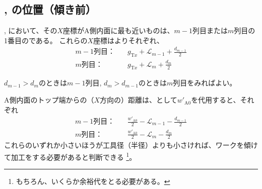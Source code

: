 \clearpage
\subsection{\BfaceDimple, \DfaceDimple の位置（傾き前）}
\BfaceDimple, \DfaceDimple において、その$X$座標がA側内面に最も近いものは、$m-1$列目または$m$列目の1番目の\nameDimple である。
これらの$X$座標はよりそれぞれ、
\begin{align*}
  m-1\text{列目：}&\quad
  g_{\mathrm Tx}+\mathcal L_{m-1}+\frac{d_{m-1}}2\\
  m\text{列目：}&\quad
  g_{\mathrm Tx}+\mathcal L_m+\frac{d_m}2
\end{align*}
\begin{hosoku}
$d_{m-1} > d_m$のときは$m-1$列目, $d_m > d_{m-1}$のときは$m$列目をみればよい。
\end{hosoku}
A側内面のトップ端からの（$X$方向の）距離は、\TopEndACID として$w'_{\mathrm A0}$を代用すると、それぞれ
\begin{align*}
  m-1\text{列目：}&\quad
  \frac{w'_{\mathrm A0}}2-\mathcal L_{m-1}-\frac{d_{m-1}}2\\
  m\text{列目：}&\quad
  \frac{w'_{\mathrm A0}}2-\mathcal L_m-\frac{d_m}2
\end{align*}
これらのいずれか小さいほうが工具径（半径）よりも小さければ、ワークを傾けて加工をする必要があると判断できる
\footnote{もちろん、いくらか余裕代をとる必要がある。}。
\vfill

